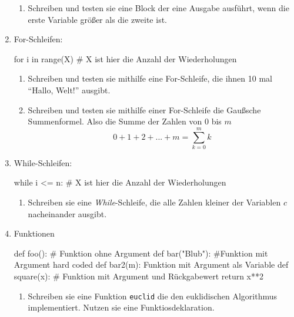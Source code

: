 \documentclass[paper=a4,fontsize=11pt]{scrartcl}%
\numberwithin{equation}{section}
\begin{document}
\begin{enumerate}
\begin{enumerate}
		\item Schreiben und testen sie eine Block der eine Ausgabe ausführt, wenn die erste Variable größer als die zweite ist.
	\end{enumerate}
	\item For-Schleifen:
\begin{python}
for i in range(X) # X ist hier die Anzahl der Wiederholungen
\end{python}
	\begin{enumerate}
		\item Schreiben und testen sie mithilfe eine For-Schleife, die ihnen 10 mal \enquote{Hallo, Welt!} ausgibt.
		\item Schreiben und testen sie mithilfe einer For-Schleife die Gaußsche Summenformel. Also die Summe der Zahlen von $0$ bis $m$
		$$ 0 + 1 + 2 + ... + m = \sum_{k=0}^m k$$
	\end{enumerate}
\item While-Schleifen:
\begin{python}
while i <= n: # X ist hier die Anzahl der Wiederholungen
\end{python}
	\begin{enumerate}
	\item Schreiben sie eine \emph{While}-Schleife, die alle Zahlen kleiner der Variablen $c$ nacheinander ausgibt.
	\end{enumerate}
	\item Funktionen
	\begin{python}
	def foo(): # Funktion ohne Argument
	def bar("Blub"): #Funktion mit Argument hard coded
	def bar2(m): Funktion mit Argument als Variable
	def square(x): # Funktion mit Argument und Rückgabewert
		return x**2
	\end{python}
\begin{enumerate}
	\item Schreiben sie eine Funktion \texttt{euclid} die den euklidischen Algorithmus implementiert. Nutzen sie eine Funktiosdeklaration.
\end{enumerate}
\end{enumerate}

\newpage
\end{document}
